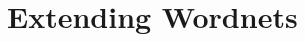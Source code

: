\documentclass{beamer}
\newcommand{\bl}[1]{\textcolor{blue}{#1}}
\begin{document}




\section{Extending Wordnets}

\end{document}
